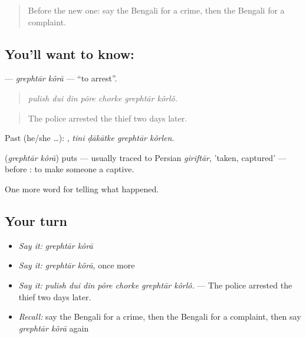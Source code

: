 \label{lesson:BN-C283-grephtar-kora}



\begin{quote}
Before the new one: say the Bengali for a crime, then the Bengali for a complaint.
\end{quote}

\subsection*{You'll want to know:  }
\textbf{ } — \emph{grephtār kôrā} — \textquotedblleft{}to arrest\textquotedblright{}.

\begin{quote}
      
\end{quote}

\begin{quote}
\emph{pulish dui din pôre chorke grephtār kôrlô.}
\end{quote}

\begin{quote}
The police arrested the thief two days later.
\end{quote}

Past (he/she …):    , \emph{tini ḍākātke grephtār kôrlen}.

\begin{cousinweb}
\textbf{ } (\emph{grephtār kôrā}) puts  — usually traced to Persian \emph{giriftār}, 'taken, captured' — before : to make someone a captive.
\end{cousinweb}

\begin{grammarlens}[title={What you've built}]
One more word for telling what happened.
\end{grammarlens}

\subsection*{Your turn}
\begin{itemize}
\raggedright
  \item \emph{Say it:} \emph{grephtār kôrā}
  \item \emph{Say it:} \emph{grephtār kôrā}, once more
  \item \emph{Say it:} \emph{pulish dui din pôre chorke grephtār kôrlô.} — The police arrested the thief two days later.
  \item \emph{Recall:} say the Bengali for a crime, then the Bengali for a complaint, then say \emph{grephtār kôrā} again
\end{itemize}

